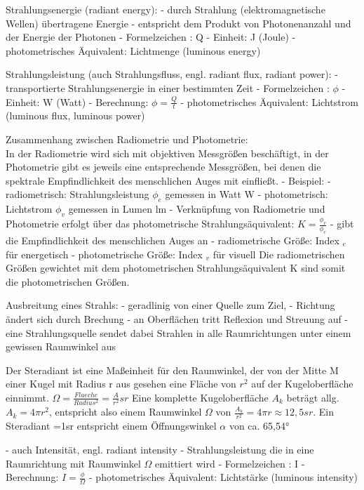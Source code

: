 \documentclass[10pt,landscape]{article}
\begin{document}
\begin{multicols}{3}
Strahlungsenergie (radiant energy):
- durch Strahlung (elektromagnetische Wellen) übertragene Energie
- entspricht dem Produkt von Photonenanzahl und der Energie der Photonen
- Formelzeichen : Q
- Einheit: J (Joule)
- photometrisches Äquivalent: Lichtmenge (luminous energy)

Strahlungsleistung (auch Strahlungsfluss, engl. radiant flux, radiant power):
- transportierte Strahlungsenergie in einer bestimmten Zeit
- Formelzeichen : $\phi$
- Einheit: W (Watt)
- Berechnung: $\phi = \frac{Q}{t}$
- photometrisches Äquivalent: Lichtstrom (luminous flux, luminous power)

Zusammenhang zwischen Radiometrie und Photometrie:\\
In der Radiometrie wird sich mit objektiven Messgrößen beschäftigt, in der Photometrie gibt es jeweils eine entsprechende Messgrößen, bei denen die spektrale Empfindlichkeit des menschlichen Auges mit einfließt.
- Beispiel:
  - radiometrisch: Strahlungsleistung $\phi_e$ gemessen in Watt W
  - photometrisch: Lichtstrom $\phi_v$ gemessen in Lumen lm
- Verknüpfung von Radiometrie und Photometrie erfolgt über das photometrische Strahlungsäquivalent: $K =\frac{\phi_v}{\phi_e}$
- gibt die Empfindlichkeit des menschlichen Auges an
- radiometrische Größe: Index $_e$ für energetisch
- photometrische Größe: Index $_v$ für visuell
Die radiometrischen Größen gewichtet mit dem photometrischen Strahlungsäquivalent K sind somit die photometrischen Größen.

Ausbreitung eines Strahls:
- geradlinig von einer Quelle zum Ziel,
- Richtung ändert sich durch Brechung
- an Oberflächen tritt Reflexion und Streuung auf
- eine Strahlungsquelle sendet dabei Strahlen in alle Raumrichtungen unter einem gewissen Raumwinkel aus

Der Steradiant ist eine Maßeinheit für den Raumwinkel, der von der Mitte M einer Kugel mit Radius r aus gesehen eine Fläche von $r^2$ auf der Kugeloberfläche einnimmt. $\Omega=\frac{Flaeche}{Radius^2}=\frac{A}{r^2}sr$
Eine komplette Kugeloberfläche $A_k$ beträgt allg. $A_k = 4\pi r^2$, entspricht also einem Raumwinkel $\Omega$ von $\frac{A_k}{r^2}= 4\pi r\approx 12,5sr$. Ein Steradiant =1sr entspricht einem Öffnungswinkel $\alpha$ von ca. 65,54°

- auch Intensität, engl. radiant intensity
- Strahlungsleistung die in eine Raumrichtung mit Raumwinkel $\Omega$ emittiert wird
- Formelzeichen : I
- Berechnung: $I=\frac{\phi}{\Omega}$
- photometrisches Äquivalent: Lichtstärke (luminous intensity)


\end{multicols}
\end{document}
